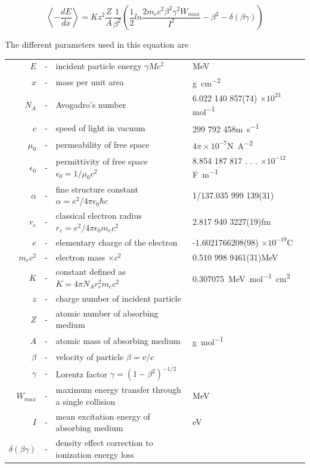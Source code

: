 \endgroup
	
	\begin{equation}
	\label{eq:bethe}
	\left\langle-\frac{dE}{dx}\right\rangle = Kz^2\frac{Z}{A}\frac{1}{\beta^2}\left(\frac{1}{2}ln\frac{2m_ec^2\beta^2\gamma^2W_{max}}{I^2}-\beta^2-\delta(\beta\gamma)\right)
	\end{equation}
	
	The different parameters used in this equation are
	
	\begin{longtable}{r c l l}
		$E$ &-& incident particle energy $\gamma Mc^2$ & \si{MeV}\\
		$x$ &-& mass per unit area & \si{g.cm^{-2}}\\
		$N_A$ &-& Avogadro's number & 6.022 140 857(74) $\times 10^{23}$\si{mol^{-1}}\\
		$c$ &-& speed of light in vacuum & 299 792 458\si{m.s^{-1}}\\
		$\mu_0$ &-& permeability of free space & 4$\pi\times 10^{-7}$\si{N.A^{-2}}\\
		$\epsilon_0$ &-& permittivity of free space $\epsilon_0 = 1/\mu_0c^2$ & 8.854 187 817 . . . $\times 10^{-12}$\si{F.m^{-1}}\\
		$\alpha$ &-& fine structure constant $\alpha = e^2/4\pi\epsilon_0\hbar c$ & 1/137.035 999 139(31)\\
		$r_e$ &-& classical electron radius $r_e = e^2/4\pi\epsilon_0m_ec^2$ & 2.817 940 3227(19)\si{fm}\\
		$e$ &-& elementary charge of the electron & -1.6021766208(98) $\times 10^{-19}$\si{C}\\
		$m_ec^2$ &-& electron mass $\times c^2$ & 0.510 998 9461(31)\si{MeV}\\
		$K$ &-& constant defined as $K = 4\pi N_A r_e^2 m_ec^2$ & \SI{0.307075}{MeV.mol^{-1}.cm^2}\\
		$z$ &-& charge number of incident particle &\\
		$Z$ &-& atomic number of absorbing medium &\\
		$A$ &-& atomic mass of absorbing medium & \si{g.mol^{-1}}\\
		$\beta$ &-& velocity of particle $\beta = v/c$ &\\
		$\gamma$ &-& Lorentz factor $\gamma = (1-\beta^2)^{-1/2}$&\\
		$W_{max}$ &-& maximum energy transfer through a single collision & \si{MeV}\\
		$I$ &-& mean excitation energy of absorbing medium & \si{eV}\\
		$\delta(\beta\gamma)$ &-& density effect correction to ionization energy loss & \\
	\end{longtable}
	

